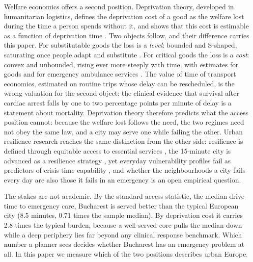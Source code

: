 \documentclass[9pt,twocolumn]{article}
\begin{document}
Welfare economics offers a second position. Deprivation theory, developed
in humanitarian logistics, defines the deprivation cost of a good as the
welfare lost during the time a person spends without it, and shows that
this cost is estimable as a function of deprivation time
\citep{holguinveras2013objective,holguinveras2016econometric}. Two objects
follow, and their difference carries this paper. For substitutable goods
the loss is a \emph{level}: bounded and S-shaped, saturating once people
adapt and substitute \citep{wang2017deprivation}. For critical goods the
loss is a \emph{cost}: convex and unbounded, rising ever more steeply with
time, with estimates for goods and for emergency ambulance services
\citep{cantillo2018discrete,macea2018attitudes,delgadolindeman2019ambulance}.
The value of time of transport economics, estimated on routine trips
whose delay can be rescheduled, is the wrong valuation for the second
object: the clinical evidence that survival after cardiac arrest falls by
one to two percentage points per minute of delay
\citep{larsen1993survival,nicholl2007distance} is a statement about
mortality. Deprivation theory therefore predicts what the access position
cannot: because the welfare lost follows the need, the two regimes need
not obey the same law, and a city may serve one while failing the other.
Urban resilience research reaches the same distinction from the other
side: resilience is defined through equitable access to essential
services \citep{meerow2016defining,logan2020reframing}, the 15-minute city
is advanced as a resilience strategy \citep{moreno2021fifteenminute}, yet
everyday vulnerability profiles fail as predictors of crisis-time
capability \citep{sirenko2026heatwaves}, and whether the neighbourhoods a
city fails every day are also those it fails in an emergency
\citep{cutter2003vulnerability} is an open empirical question.

The stakes are not academic. By the standard access statistic, the median
drive time to emergency care, Bucharest is served better than the typical
European city (8.5 minutes, 0.71 times the sample median). By deprivation
cost it carries 2.8 times the typical burden, because a well-served core
pulls the median down while a deep periphery lies far beyond any clinical
response benchmark. Which number a planner sees decides whether Bucharest
has an emergency problem at all. In this paper we measure which of the two
positions describes urban Europe.
\end{document}

